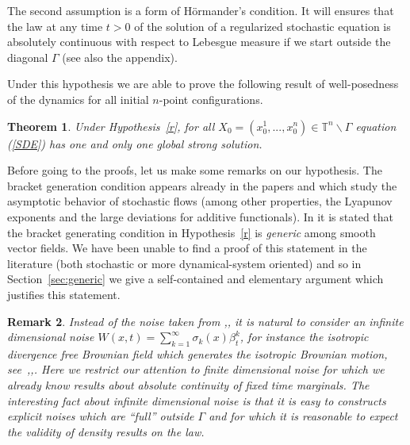 \documentclass[11pt,a4paper]{article}%
\newtheorem{theorem}{Theorem}
\newtheorem{remark}[theorem]{Remark}
\begin{document}
The second assumption is a form of H\"{o}rmander's condition. It
will ensures that the law at  any time $t>0$
of the solution of a
regularized stochastic  equation is absolutely continuous with respect to
Lebesgue measure if we start outside the diagonal $\Gamma$ (see also
the appendix).



Under this hypothesis we are able to prove the following result of
well-posedness of the dynamics for  all initial $n$-point
configurations.

\begin{theorem}
\label{main theorem}Under Hypothesis~\ref{r},
for all
$X_{0}=(x_{0}^{1},...,x_{0}^{n})\in{\mathbb{T}}^{n}\backslash\Gamma$
equation (\ref{SDE}) has one and only one global strong solution.
\end{theorem}


Before going to the proofs,
let us make some remarks on our
hypothesis. The bracket generation condition appears already in  the
papers \cite{BaxStroock} and \cite{DolgKK} which study the
asymptotic behavior of stochastic flows (among
other properties, the
Lyapunov exponents and the large deviations for additive
functionals). In \cite[Section 2]{DolgKK} it is stated that the
bracket generating condition in Hypothesis~\ref{r} is \emph{generic}
among smooth vector fields. We have been unable to find a proof of
this statement in the literature (both stochastic or more
dynamical-system oriented) and so in Section~\ref{sec:generic} we give a
self-contained and elementary argument which justifies  this
statement.




\begin{remark}
Instead of the noise taken from \cite{BaxStroock},\cite{DolgKK}, it is
natural to consider an infinite dimensional noise $W( x,t) =\sum_{k=1}%
^{\infty}\sigma_{k}( x) \beta_{t}^{k}$, for instance the isotropic
divergence free Brownian field which generates the isotropic
Brownian motion, see~\cite{BaxHarris},\cite{LeJan},\cite{LeJan Ray}.
Here we restrict our attention to finite dimensional noise for which
we already know results about absolute continuity of fixed time
marginals.  The interesting fact about infinite dimensional
noise is that it is easy to constructs explicit noises which are
``full'' outside $\Gamma$ and for which it is reasonable to expect
the validity of density results on the law.
\end{remark}
\end{document}
